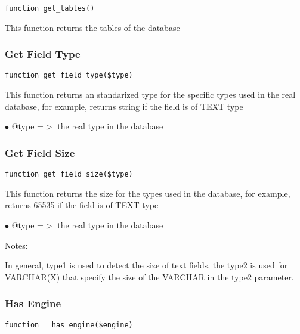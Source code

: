 \documentclass[a4paper]{article}
\begin{document}
\begin{lstlisting}
function get_tables()
\end{lstlisting}

This function returns the tables of the database

\hypertarget{toc222}{}
\subsubsection{Get Field Type}

\begin{lstlisting}
function get_field_type($type)
\end{lstlisting}

This function returns an standarized type for the specific types used in
the real database, for example, returns string if the field is of TEXT type

\begin{compactitem}
\item[\color{myblue}$\bullet$] @type =$>$ the real type in the database
\end{compactitem}

\hypertarget{toc223}{}
\subsubsection{Get Field Size}

\begin{lstlisting}
function get_field_size($type)
\end{lstlisting}

This function returns the size for the types used in the database, for
example, returns 65535 if the field is of TEXT type

\begin{compactitem}
\item[\color{myblue}$\bullet$] @type =$>$ the real type in the database
\end{compactitem}

Notes:

In general, type1 is used to detect the size of text fields, the type2
is used for VARCHAR(X) that specify the size of the VARCHAR in the type2
parameter.

\hypertarget{toc224}{}
\subsubsection{Has Engine}

\begin{lstlisting}
function __has_engine($engine)
\end{lstlisting}
\end{document}
